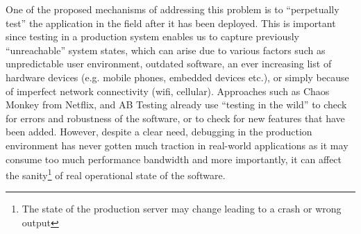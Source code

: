 One of the proposed mechanisms of addressing this problem is to ``perpetually test''\cite{perpetual} the application in the field after it has been deployed. 
This is important since testing in a production system enables us to capture previously ``unreachable'' system states, which can arise due to various factors such as unpredictable user environment, outdated software, an ever increasing list of hardware devices (e.g. mobile phones, embedded devices etc.), or simply because of imperfect network connectivity (wifi, cellular).
Approaches such as Chaos Monkey\cite{chaosmonkey} from Netflix, and AB Testing\cite{abtesting} already use ``testing in the wild'' to check for errors and robustness of the software, or to check for new features that have been added.  
However, despite a clear need, debugging in the production environment has never gotten much traction in real-world applications as it may consume too much performance bandwidth and more importantly, it can affect the sanity\footnote{The state of the production server may change leading to a crash or wrong output} of real operational state of the software.



